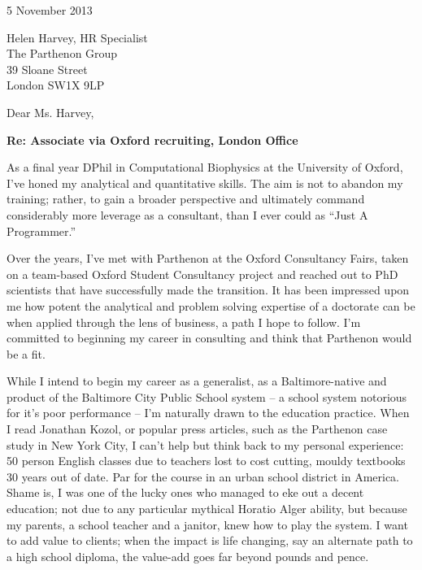 \documentclass[a4paper]{../res}
\begin{document}
 
\begin{sloppypar}
 
%


\begin{resume} 
 
5 November 2013

Helen Harvey, HR Specialist \\
The Parthenon Group \\
39 Sloane Street \\
London SW1X 9LP

Dear Ms. Harvey, %

\textbf{Re: Associate via Oxford recruiting, London Office}

As a final year DPhil in Computational Biophysics at the University of Oxford, I've honed my analytical and quantitative skills. The aim is not to abandon my training; rather, to gain a broader perspective and ultimately command considerably more leverage as a consultant, than I ever could as ``Just A Programmer.'' 

Over the years, I've met with Parthenon at the Oxford Consultancy Fairs, taken on a team-based Oxford Student Consultancy project and reached out to PhD scientists that have successfully made the transition. It has been impressed upon me how potent the analytical and problem solving expertise of a doctorate can be when applied through the lens of business, a path I hope to follow. I'm committed to beginning my career in consulting and think that Parthenon would be a fit.

While I intend to begin my career as a generalist, as a Baltimore-native and product of the Baltimore City Public School system -- a school system notorious for it's poor performance -- I'm naturally drawn to the education practice. When I read Jonathan Kozol, or popular press articles, such as the Parthenon case study in New York City, I can't help but think back to my personal experience: 50 person English classes due to teachers lost to cost cutting, mouldy textbooks 30 years out of date. Par for the course in an urban school district in America. Shame is, I was one of the lucky ones who managed to eke out a decent education; not due to any particular mythical Horatio Alger ability, but because my parents, a school teacher and a janitor, knew how to play the system. I want to add value to clients; when the impact is life changing, say an alternate path to a high school diploma, the value-add goes far beyond pounds and pence.


\end{resume}
\end{sloppypar}
\end{document}

